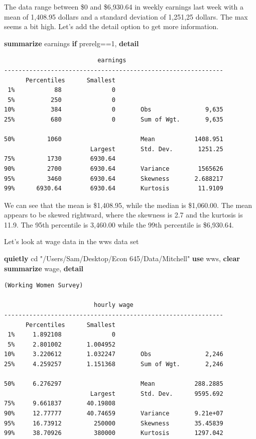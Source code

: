 \documentclass[
]{book}
\newenvironment{Shaded}{\begin{snugshade}}{\end{snugshade}}
\newcommand{\KeywordTok}[1]{\textcolor[rgb]{0.13,0.29,0.53}{\textbf{#1}}}
\newcommand{\NormalTok}[1]{#1}
\newcommand{\StringTok}[1]{\textcolor[rgb]{0.31,0.60,0.02}{#1}}
\begin{document}
The data range between \$0 and \$6,930.64 in weekly earnings last week with a mean of 1,408.95 dollars and a standard deviation of 1,251,25 dollars. The max seems
a bit high. Let's add the detail option to get more information.

\begin{Shaded}
\begin{Highlighting}[]
\KeywordTok{summarize}\NormalTok{ earnings }\KeywordTok{if}\NormalTok{ prerelg==1, }\KeywordTok{detail}
\end{Highlighting}
\end{Shaded}

\begin{verbatim}
                          earnings
-------------------------------------------------------------
      Percentiles      Smallest
 1%           88              0
 5%          250              0
10%          384              0       Obs               9,635
25%          680              0       Sum of Wgt.       9,635

50%         1060                      Mean           1408.951
                        Largest       Std. Dev.       1251.25
75%         1730        6930.64
90%         2700        6930.64       Variance        1565626
95%         3460        6930.64       Skewness       2.688217
99%      6930.64        6930.64       Kurtosis        11.9109
\end{verbatim}

We can see that the mean is \$1,408.95, while the median is \$1,060.00. The mean appears to be skewed rightward, where the skewness is 2.7 and the kurtosis is 11.9. The 95th percentile is 3,460.00 while the 99th percentile is \$6,930.64.

Let's look at wage data in the wws data set

\begin{Shaded}
\begin{Highlighting}[]
\KeywordTok{quietly}\NormalTok{ cd }\StringTok{"/Users/Sam/Desktop/Econ 645/Data/Mitchell"}
\KeywordTok{use}\NormalTok{ wws, }\KeywordTok{clear}
\KeywordTok{summarize}\NormalTok{ wage, }\KeywordTok{detail}
\end{Highlighting}
\end{Shaded}

\begin{verbatim}
(Working Women Survey)

                         hourly wage
-------------------------------------------------------------
      Percentiles      Smallest
 1%     1.892108              0
 5%     2.801002       1.004952
10%     3.220612       1.032247       Obs               2,246
25%     4.259257       1.151368       Sum of Wgt.       2,246

50%     6.276297                      Mean           288.2885
                        Largest       Std. Dev.      9595.692
75%     9.661837       40.19808
90%     12.77777       40.74659       Variance       9.21e+07
95%     16.73912         250000       Skewness       35.45839
99%     38.70926         380000       Kurtosis       1297.042
\end{verbatim}
\end{document}
